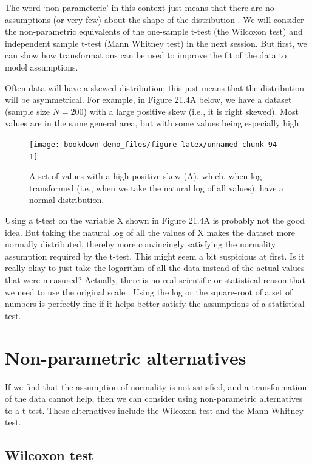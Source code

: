 \documentclass[
]{scrbook}
\begin{document}
The word `non-parameteric' in this context just means that there are no assumptions (or very few) about the shape of the distribution \citep{Dytham2011}.
We will consider the non-parametric equivalents of the one-sample t-test (the Wilcoxon test) and independent sample t-test (Mann Whitney test) in the next session.
But first, we can show how transformations can be used to improve the fit of the data to model assumptions.

Often data will have a skewed distribution; this just means that the distribution will be asymmetrical.
For example, in Figure 21.4A below, we have a dataset (sample size \(N = 200\)) with a large positive skew (i.e., it is right skewed).
Most values are in the same general area, but with some values being especially high.

\begin{figure}
\texttt{[image: bookdown-demo\_files/figure-latex/unnamed-chunk-94-1]} \caption{A set of values with a high positive skew (A), which, when log-transformed (i.e., when we take the natural log of all values), have a normal distribution.}\label{fig:unnamed-chunk-94}
\end{figure}

Using a t-test on the variable X shown in Figure 21.4A is probably not the good idea.
But taking the natural log of all the values of X makes the dataset more normally distributed, thereby more convincingly satisfying the normality assumption required by the t-test.
This might seem a bit suspicious at first.
Is it really okay to just take the logarithm of all the data instead of the actual values that were measured?
Actually, there is no real scientific or statistical reason that we need to use the original scale \citep{Sokal1995}.
Using the log or the square-root of a set of numbers is perfectly fine if it helps better satisfy the assumptions of a statistical test.

\hypertarget{non-parametric-alternatives}{%
\section{Non-parametric alternatives}\label{non-parametric-alternatives}}

If we find that the assumption of normality is not satisfied, and a transformation of the data cannot help, then we can consider using non-parametric alternatives to a t-test.
These alternatives include the Wilcoxon test and the Mann Whitney test.

\hypertarget{wilcoxon-test}{%
\subsection{Wilcoxon test}\label{wilcoxon-test}}
\end{document}
